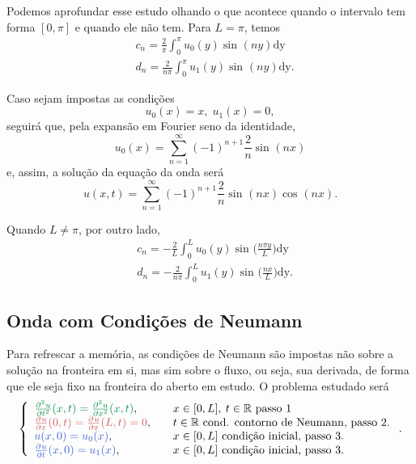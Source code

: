 \documentclass[../pde_notes.tex]{subfiles}
\begin{document}
\begin{example}
	Podemos aprofundar esse estudo olhando o que acontece quando o intervalo tem forma \([0, \pi ]\) e quando ele não tem. Para \(L = \pi \), temos
	\begin{align*}
		 & c_{n} = \frac{2}{\pi }\int_{0}^{\pi }u_{0}(y)\sin^{}{(ny)} \mathrm{dy}   \\
		 & d_{n} = \frac{2}{n\pi }\int_{0}^{\pi }u_{1}(y)\sin^{}{(ny)} \mathrm{dy}.
	\end{align*}

	Caso sejam impostas as condições
	\[
		u_{0}(x) = x,\; u_{1}(x) = 0,
	\]
	seguirá que, pela expansão em Fourier seno da identidade,
	\[
		u_{0}(x) = \sum\limits_{n=1}^{\infty}(-1)^{n+1}\frac{2}{n}\sin^{}{(nx)}
	\]
	e, assim, a solução da equação da onda será
	\[
		u(x, t) = \sum\limits_{n=1}^{\infty}(-1)^{n+1}\frac{2}{n}\sin^{}{(nx)}\cos^{}{(nx)}.
	\]

	Quando \(L\neq \pi \), por outro lado,
	\begin{align*}
		 & c_{n} = -\frac{2}{L}\int_{0}^{L}u_{0}(y)\sin^{}{\biggl(\frac{n\pi y}{L}\biggr)} \mathrm{dy} \\
		 & d_{n} = -\frac{2}{n\pi } \int_{0}^{L}u_1(y)\sin^{}{\biggl(\frac{nx}{L}\biggr)} \mathrm{dy}.
	\end{align*}
\end{example}

\subsection{Onda com Condições de Neumann}
Para refrescar a memória, as condições de Neumann são impostas não sobre a solução na fronteira em si, mas sim sobre o fluxo, ou seja, sua derivada, de forma que ele seja fixo na fronteira do aberto em estudo. O problema estudado será
\[
	\left\{\begin{array}{ll}
		{\color{SpringGreen4}\frac{\partial^{2}u}{\partial t^{2}}(x, t)=\frac{\partial^{2}u}{\partial x^{2}}(x, t)}, & \quad x\in [0, L],\: t\in \mathbb{R} \text{ passo 1}              \\
		{\color{IndianRed3}\frac{\partial^{}u}{\partial x^{}}(0, t) = \frac{\partial^{}u}{\partial x^{}}(L, t)=0},   & \quad t\in \mathbb{R} \text{ cond. contorno de Neumann, passo 2.} \\
		{\color{RoyalBlue3}u(x,0)=u_{0}(x)},                                                                         & \quad  x\in [0, L]     \text{ condição inicial, passo 3.}         \\
		{\color{RoyalBlue3}\frac{\partial^{}u}{\partial t^{}}(x,0)=u_{1}(x)},                                        & \quad  x\in [0, L]\text{ condição inicial, passo 3.}
	\end{array}\right..
\]
\end{document}
